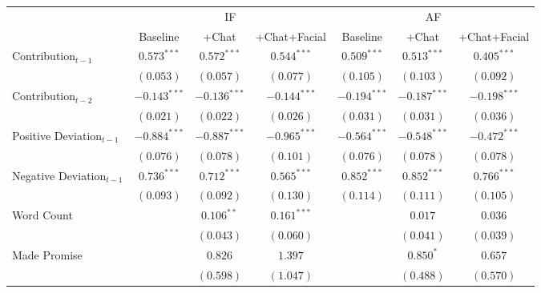 
\begin{adjustbox}{max width=\textwidth}
\begin{tabular}{l c c c c c c}
\toprule
 & \multicolumn{3}{c}{IF} & \multicolumn{3}{c}{AF} \\
\cmidrule(lr){2-4} \cmidrule(lr){5-7}
 & Baseline & +Chat & +Chat+Facial & Baseline & +Chat & +Chat+Facial \\
\midrule
Contribution$_{t-1}$                              & $0.573^{***}$   & $0.572^{***}$   & $0.544^{***}$   & $0.509^{***}$  & $0.513^{***}$  & $0.405^{***}$  \\
                                                  & $(0.053)$       & $(0.057)$       & $(0.077)$       & $(0.105)$      & $(0.103)$      & $(0.092)$      \\
Contribution$_{t-2}$                              & $-0.143^{***}$  & $-0.136^{***}$  & $-0.144^{***}$  & $-0.194^{***}$ & $-0.187^{***}$ & $-0.198^{***}$ \\
                                                  & $(0.021)$       & $(0.022)$       & $(0.026)$       & $(0.031)$      & $(0.031)$      & $(0.036)$      \\
Positive Deviation$_{t-1}$                        & $-0.884^{***}$  & $-0.887^{***}$  & $-0.965^{***}$  & $-0.564^{***}$ & $-0.548^{***}$ & $-0.472^{***}$ \\
                                                  & $(0.076)$       & $(0.078)$       & $(0.101)$       & $(0.076)$      & $(0.078)$      & $(0.078)$      \\
Negative Deviation$_{t-1}$                        & $0.736^{***}$   & $0.712^{***}$   & $0.565^{***}$   & $0.852^{***}$  & $0.852^{***}$  & $0.766^{***}$  \\
                                                  & $(0.093)$       & $(0.092)$       & $(0.130)$       & $(0.114)$      & $(0.111)$      & $(0.105)$      \\
Word Count                                        &                 & $0.106^{**}$    & $0.161^{***}$   &                & $0.017$        & $0.036$        \\
                                                  &                 & $(0.043)$       & $(0.060)$       &                & $(0.041)$      & $(0.039)$      \\
Made Promise                                      &                 & $0.826$         & $1.397$         &                & $0.850^{*}$    & $0.657$        \\
                                                  &                 & $(0.598)$       & $(1.047)$       &                & $(0.488)$      & $(0.570)$      \\

\end{tabular}
\end{adjustbox}
